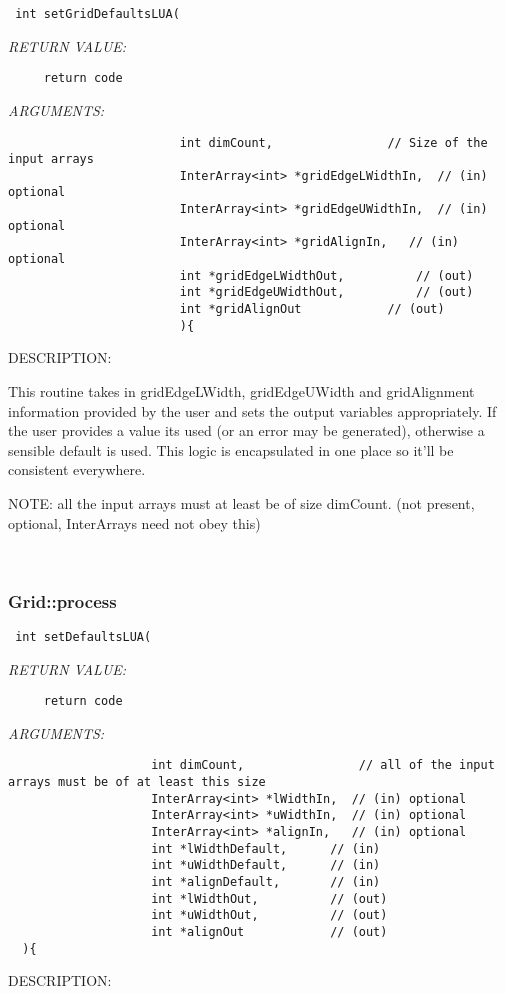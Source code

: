   
\begin{verbatim} int setGridDefaultsLUA(\end{verbatim}{\em RETURN VALUE:}
\begin{verbatim}     return code\end{verbatim}{\em ARGUMENTS:}
\begin{verbatim}                        int dimCount,                // Size of the input arrays
                        InterArray<int> *gridEdgeLWidthIn,  // (in) optional
                        InterArray<int> *gridEdgeUWidthIn,  // (in) optional
                        InterArray<int> *gridAlignIn,   // (in) optional
                        int *gridEdgeLWidthOut,          // (out)
                        int *gridEdgeUWidthOut,          // (out)
                        int *gridAlignOut            // (out)
                        ){\end{verbatim}
{\sf DESCRIPTION:\\ }


     This routine takes in gridEdgeLWidth, gridEdgeUWidth and gridAlignment 
   information provided by the user and sets the output variables appropriately.
   If the user provides a value its used
   (or an error may be generated), otherwise a sensible default is used.
   This logic is encapsulated in one place so it'll be consistent everywhere. 
  
   NOTE: all the input arrays must at least be of size dimCount. (not present, optional,
         InterArrays need not obey this)
     
 
\mbox{}\hrulefill\
 
\subsubsection [Grid::process] {Grid::process}


  
\begin{verbatim} int setDefaultsLUA(\end{verbatim}{\em RETURN VALUE:}
\begin{verbatim}     return code\end{verbatim}{\em ARGUMENTS:}
\begin{verbatim}                    int dimCount,                // all of the input arrays must be of at least this size 
                    InterArray<int> *lWidthIn,  // (in) optional
                    InterArray<int> *uWidthIn,  // (in) optional
                    InterArray<int> *alignIn,   // (in) optional
                    int *lWidthDefault,      // (in)
                    int *uWidthDefault,      // (in)
                    int *alignDefault,       // (in)
                    int *lWidthOut,          // (out)
                    int *uWidthOut,          // (out)
                    int *alignOut            // (out)
  ){\end{verbatim}
{\sf DESCRIPTION:\\ }



